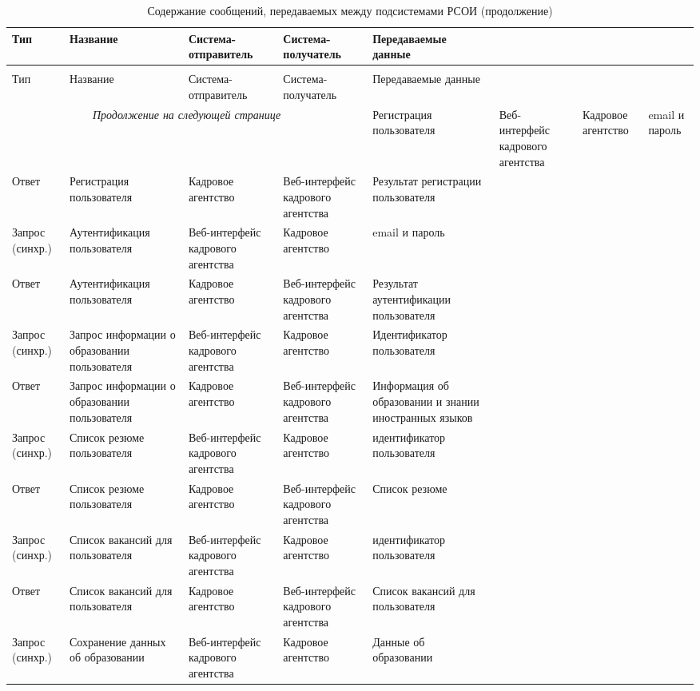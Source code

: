 \begin{longtable}[ht]{|p{}|p{3cm}|p{3cm}|p{3cm}|p{}|}
\caption{Содержание сообщений, передаваемых между подсистемами РСОИ}\label{tab:tab-messages} \\
\hline
Тип & Название & Система- отправитель  & Система- получатель & Передаваемые данные \\
\hline\hline\endfirsthead
\caption{Содержание сообщений, передаваемых между подсистемами РСОИ (продолжение)} \\
\hline
Тип & Название & Система- отправитель  & Система- получатель & Передаваемые данные \\
\hline\hline\endhead
\hline
\multicolumn{4}{c}{\textit{Продолжение на следующей странице}}
\endfoot
\endlastfoot
Запрос (синхр.)	& Регистрация пользователя	& Веб-интерфейс кадрового агентства 	& Кадровое агентство	& email и пароль\\
\hline
Ответ	& Регистрация пользователя	& Кадровое агентство & Веб-интерфейс кадрового агентства	& Результат регистрации пользователя\\
\hline
Запрос (синхр.)	& Аутентификация пользователя	& Веб-интерфейс кадрового агентства 	& Кадровое агентство	& email и пароль\\
\hline
Ответ	& Аутентификация пользователя	& Кадровое агентство & Веб-интерфейс кадрового агентства	& Результат аутентификации пользователя\\
\hline
Запрос (синхр.)	& Запрос информации о образовании пользователя	& Веб-интерфейс кадрового агентства 	& Кадровое агентство	& Идентификатор пользователя\\
\hline
Ответ	& Запрос информации о образовании пользователя	& Кадровое агентство & Веб-интерфейс кадрового агентства	& Информация об образовании и знании иностранных языков\\
\hline
Запрос (синхр.)	& Список резюме пользователя	& Веб-интерфейс кадрового агентства 	& Кадровое агентство	& идентификатор пользователя\\
\hline
Ответ	& Список резюме пользователя	& Кадровое агентство & Веб-интерфейс кадрового агентства	& Список резюме\\
\hline
Запрос (синхр.)	& Список вакансий для пользователя	& Веб-интерфейс кадрового агентства 	& Кадровое агентство	& идентификатор пользователя\\
\hline
Ответ	& Список вакансий для пользователя	& Кадровое агентство & Веб-интерфейс кадрового агентства	& Список вакансий для пользователя\\
\hline
Запрос (синхр.)	& Сохранение данных об образовании & Веб-интерфейс кадрового агентства 	& Кадровое агентство	& Данные об образовании\\

\end{longtable}
